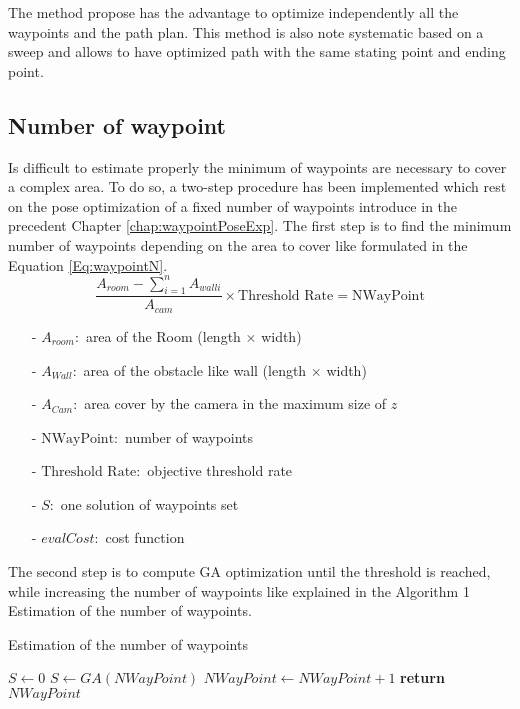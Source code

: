 The method propose has the advantage to optimize independently all the waypoints  and the path plan. This method is also note systematic based on a sweep and allows to have optimized path with the same stating point and ending point. 


\subsection{Number of waypoint }

Is difficult to estimate properly the minimum of waypoints are necessary to cover a complex area.
To do so, a two-step procedure has been implemented which rest on the pose optimization of a fixed number of waypoints introduce in the precedent Chapter \ref{chap:waypointPoseExp}. 
The first step is to find the minimum number of waypoints depending on the area to cover like formulated in the
 Equation \ref{Eq:waypointN}. \\
\begin{equation}\label{Eq:waypointN}
\frac{ A_{room} - \sum_{i=1}^n A_{wall i} }{A_{cam}} \times \mbox{Threshold Rate} = \mbox{NWayPoint}
\end{equation}

\begin{itemize}
\item[-] $ A_{room}: $  area of the Room (length $\times$ width)
\item[-] $ A_{Wall}: $  area of the obstacle like wall (length $\times$ width)
\item[-] $ A_{Cam}: $   area cover by the camera in the maximum size of $z$
\item[-] $ \mbox{NWayPoint}: $  number of waypoints
\item[-] $ \mbox{Threshold Rate}: $ objective threshold rate 
\item[-] $S:$ one solution of waypoints set 
\item[-] $evalCost:$ cost function  
\end{itemize}

The second step is to compute GA optimization until the threshold is reached, while increasing the number of waypoints like explained in the Algorithm 1 Estimation of the number of waypoints.  

\begin{algorithm}{}
\caption{Estimation of the number of waypoints}\label{alg:euclid}
\begin{algorithmic}[6]
 \State $S\gets 0$
	 \State $S \gets GA(NWayPoint)$
	  \State $NWayPoint\gets NWayPoint+1$
  \EndWhile\label{endwhile}
\State \textbf{return} $NWayPoint$
\EndProcedure
\end{algorithmic}
\end{algorithm}


